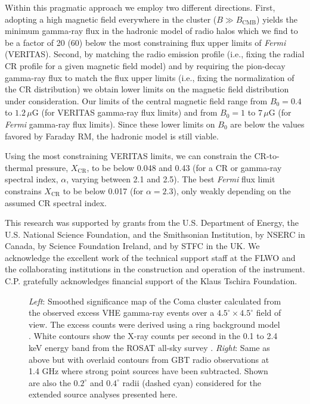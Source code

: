 \documentclass[12pt,manuscript]{aastex}
\newcommand{\rmn}{\mathrm}
\newcommand{\CR}{\mathrm{CR}}
\begin{document}
Within this pragmatic approach we employ two different directions. First, adopting a high magnetic field everywhere in the cluster ($B\gg B_\rmn{CMB}$) yields the minimum gamma-ray flux in the hadronic model of radio halos which we find to be a factor of 20 (60) below the most constraining flux upper limits of {\em Fermi} (VERITAS). Second, by matching the radio emission profile (i.e., fixing the radial CR profile for a given magnetic field model) and by requiring the pion-decay gamma-ray flux to match the flux upper limits (i.e., fixing the normalization of the CR distribution) we obtain lower limits on the magnetic field distribution under consideration. Our limits of the central magnetic field range from $B_{0} = 0.4$ to $1.2\,\mu$G (for VERITAS gamma-ray flux limits) and from $B_{0} = 1$ to $7\,\mu$G (for {\em Fermi} gamma-ray flux limits). Since these lower limits on $B_0$ are below the values favored by Faraday RM, the hadronic model is still viable.

Using the most constraining VERITAS limits, we can constrain the CR-to-thermal pressure, $X_\CR$, to be below 0.048 and 0.43 (for a CR or gamma-ray spectral index, $\alpha$, varying between 2.1 and 2.5).  The best {\em Fermi} flux limit constrains $X_\CR$ to be below 0.017 (for $\alpha=2.3$), only weakly depending on the assumed CR spectral index.



\acknowledgments
This research was supported by grants from the U.S. Department of Energy, the U.S. National Science Foundation, and the Smithsonian Institution, by NSERC in Canada, by Science Foundation Ireland, and by STFC in the UK. We acknowledge the excellent work of the technical support staff at the FLWO and the collaborating institutions in the construction and operation of the instrument. C.P. gratefully acknowledges financial support of the Klaus Tschira Foundation.





\begin{figure*}
\begin{center}
\end{center}
\caption{\emph{Left}: Smoothed significance map of the Coma cluster calculated from the observed excess VHE gamma-ray events over a $4.5^{\circ}\times 4.5^{\circ}$ field of view. The excess counts were derived using a ring background model \citep{article:Aharonian_etal:2001}. White contours show the X-ray counts per second in the 0.1 to 2.4 keV energy band from the ROSAT all-sky survey \citep{article:BrielHenryBohringer:1992}. \emph{Right}: Same as above but with overlaid contours from GBT radio observations at 1.4 GHz \citep{article:BrownRudnick:2010} where strong point sources have been subtracted. Shown are also the $0.2^{\circ}$ and $0.4^{\circ}$ radii (dashed cyan) considered for the extended source analyses presented here.}
\label{fig:skymaps}
\end{figure*}
\end{document}
